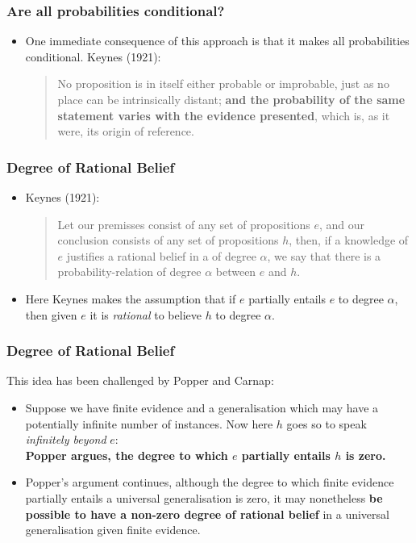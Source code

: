 \documentclass[usenames,dvipsnames, 10pt]{beamer}
\begin{document}
\begin{frame}
	\frametitle{Are all probabilities conditional?}
	\begin{itemize}
		\item One immediate consequence of this approach is that it makes all probabilities
		conditional. Keynes (1921):
		\vspace{1cm}
		
		
		\begin{quote}
			No proposition is in itself either probable or improbable, just as no place can
			be intrinsically distant; \textbf{and the probability of the same statement varies with
			the evidence presented}, which is, as it were, its origin of reference.
		\end{quote}
	\end{itemize}
\end{frame}

\begin{frame}
	\frametitle{Degree of Rational Belief}
	\begin{itemize}
		\item Keynes (1921):
		\vspace{0.3cm}
		
		\begin{quote}
			Let our premisses consist of any set of propositions $e$, and our conclusion
			consists of any set of propositions $h$, then, if a knowledge of $e$ justifies a
			rational belief in a of degree $\alpha$, we say that there is a probability-relation of	degree $\alpha$ between $e$ and $h$.
		\end{quote}
	
		\pause
		\item Here Keynes makes the assumption that if $e$ partially entails $e$ to degree $\alpha$, then given $e$ it is \emph{rational} to believe $h$ to degree $\alpha$.		
	\end{itemize}
\end{frame}

\begin{frame}
	\frametitle{Degree of Rational Belief}
	This idea has been challenged by Popper and Carnap:
	\begin{itemize}
		\item Suppose we have finite evidence and a generalisation
		which may have a potentially infinite number of instances. Now here $h$ goes so to speak
		\emph{infinitely beyond} $e$:\\
		 \textbf{Popper argues, the degree to which $e$ partially entails $h$ is zero.}
		
		\pause
	
		\item Popper’s argument
		continues, although the degree to which finite evidence partially entails a universal generalisation is zero, it may nonetheless \textbf{be possible to have a non-zero degree of rational belief} in a universal generalisation given finite evidence.
	\end{itemize}
\end{frame}
\end{document}
